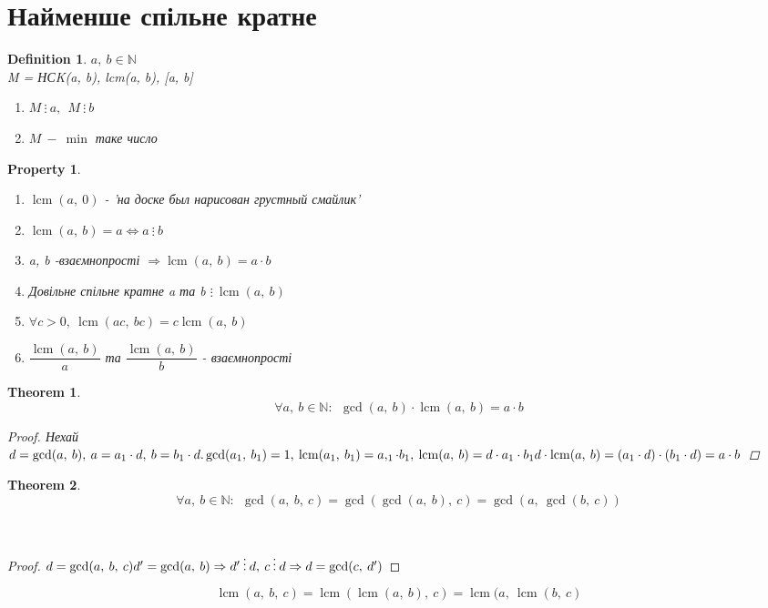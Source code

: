 \documentclass[a4paper,12pt, centered]{bookest}
\newtheorem{theorem}{Theorem}[section]
\newtheorem{definition}{Definition}[section]
\newtheorem*{property*}{Property}
\DeclareMathOperator{\lcm}{lcm}
\begin{document}
\section{Найменше спільне кратне}
\begin{definition}

$a,\>b\in\mathbb{N}$\\
M = НСK(a, b), lcm(a, b), [a, b]
\begin{enumerate}
	\item $M\>\vdots\>a,\>\>M\>\vdots\>b$
	\item $M\>-\>\min$ таке число
\end{enumerate}
\end{definition}
\begin{property*}$ $
	\begin{enumerate}
		\item $\lcm(a,\>0)$ - 'на доске был нарисован грустный смайлик'
		\item $\lcm(a,\>b) = a\Leftrightarrow a\>\vdots\>b$
		\item a, b -взаємнопрості $\Rightarrow\lcm(a,\>b)=a\cdot b$
		\item Довільне спільне кратне a та b $\vdots\>\lcm(a,\>b)$
		\item $\forall c>0,\>\lcm(ac,\>bc)=c\lcm(a,\>b)$
		\item $\dfrac{\lcm(a,\>b)}{a}$ та $\dfrac{\lcm(a,\>b)}{b}$ - взаємнопрості
	\end{enumerate}
\end{property*}
\begin{theorem}
	$$\forall a,\>b\in\mathbb{N}:\>\>\gcd(a,\>b)\cdot\lcm(a,\>b)=a\cdot b$$
	\begin{proof}
		Нехай $d=\gcd(a,\>b),\>a=a_1\cdot d,\>b=b_1\cdot d.\\\gcd(a_1,\>b_1)=1,\>\lcm(a_1,\>b_1)=a,_1\cdot b_1,\>\lcm(a,\>b)=d\cdot a_1\cdot b_1\\ d\cdot\lcm(a,\>b)=(a_1\cdot d)\cdot(b_1\cdot d)=a\cdot b$
	\end{proof}
\end{theorem}
\begin{theorem}
	$$\forall a,\>b\in\mathbb{N}:\>\>\gcd(a,\>b,\>c)=\gcd(\gcd(a,\>b),\>c)=\gcd(a,\>\gcd(b,\>c))$$
\end{theorem}$ $
	\begin{proof}
		$d=\gcd(a,\>b,\>c)\\d'=\gcd(a,\>b)\Rightarrow d'\>\vdots\>d,\>c\>\vdots\>d\Rightarrow d=\gcd(c,\>d')$
	\end{proof}
$$\lcm(a,\>b,\>c)=\lcm(\lcm(a,\>b),\>c)=\lcm(a,\>\lcm(b,\>c)$$
\end{document}
